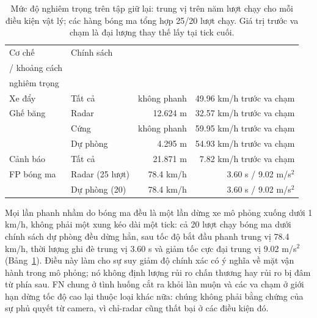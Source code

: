 \documentclass[11pt,a4paper]{article}
\begin{document}
\begin{table}[t]
\caption{Mức độ nghiêm trọng trên tập giữ lại: trung vị trên năm lượt chạy cho
mỗi điều kiện vật lý; các hàng bóng ma tổng hợp 25/20 lượt chạy. Giá trị trước
va chạm là đại lượng thay thế lấy tại tick cuối.}
\label{tab:severity}
\centering\small
\setlength{\tabcolsep}{4pt}
\begin{tabular*}{\textwidth}{@{\extracolsep{\fill}}llrr}
\toprule Cơ chế & Chính sách & \begin{tabular}[b]{@{}r@{}}Bắt đầu phanh\\/ khoảng cách\end{tabular} & \begin{tabular}[b]{@{}r@{}}Kết quả mức độ\\nghiêm trọng\end{tabular}\\ \midrule
Xe đẩy & Tất cả & không phanh & 49.96 km/h trước va chạm\\
Ghế băng & Radar & 12.624 m & 32.57 km/h trước va chạm\\
 & Cứng & không phanh & 59.95 km/h trước va chạm\\
 & Dự phòng & 4.295 m & 54.93 km/h trước va chạm\\
Cảnh báo & Tất cả & 21.871 m & 7.82 km/h trước va chạm\\
\midrule
FP bóng ma & Radar (25 lượt) & 78.4 km/h & 3.60 s / 9.02 m/s$^2$\\
 & Dự phòng (20) & 78.4 km/h & 3.60 s / 9.02 m/s$^2$\\
\bottomrule
\end{tabular*}
\end{table}

Mọi lần phanh nhầm do bóng ma đều là một lần dừng xe mô phỏng xuống dưới
1 km/h, không phải một xung kéo dài một tick: cả 20 lượt chạy bóng ma dưới
chính sách dự phòng đều dừng hẳn, sau tốc độ bắt đầu phanh trung vị 78.4 km/h,
thời lượng ghi đè trung vị 3.60 s và giảm tốc cực đại trung vị 9.02 m/s$^2$
(Bảng~\ref{tab:severity}). Điều này làm cho sự suy giảm độ chính xác có ý nghĩa
về mặt vận hành trong mô phỏng; nó không định lượng rủi ro chấn thương hay rủi
ro bị đâm từ phía sau.
FN chung ở tình huống cắt ra khỏi làn muộn và các va chạm ở giới hạn dừng tốc
độ cao lại thuộc loại khác nữa: chúng không phải bằng chứng của sự phủ quyết
từ camera, vì chỉ-radar cũng thất bại ở các điều kiện đó.
\end{document}
